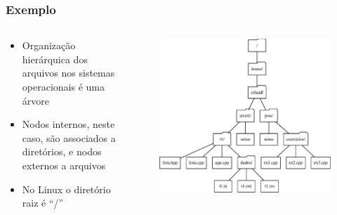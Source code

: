 \documentclass[aspectratio=169]{beamer}
\begin{document}
\begin{frame}\frametitle{Exemplo}
\begin{columns}[T]
\begin{column}{0.4\linewidth}
\begin{itemize}
	\item Organização hierárquica dos arquivos nos sistemas operacionais é uma árvore
	\item Nodos internos, neste caso, são associados a diretórios, e nodos externos a arquivos
	\item No Linux o diretório raiz é ``/''
\end{itemize}
\end{column}
\begin{column}{0.6\linewidth}
\vspace{-5mm}
\begin{figure}[h]
	\centering
	\includegraphics[height=0.7\paperheight]{imagens/arvore4.eps}
\end{figure}
\end{column}
\end{columns}
\end{frame}
\end{document}
